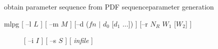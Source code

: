 % 
% 
% 
% 
%                                                                        
%
\hypertarget{mlpg}{}
%
{obtain parameter sequence from PDF sequence}{parameter generation}

\begin{synopsis}
	\item [mlpg] [ --l $L$ ] [ --m $M$ ] 
		[--d ($fn$ $|$ $d_0$ [$d_1$ $\dots$]) ]
		[--r $N_R$ $W_1$ [$W_2$] ]
	\item [\ ~~~~] [ --i $I$ ] [ --s $S$ ] [ {\em infile} ] 
\end{synopsis}

